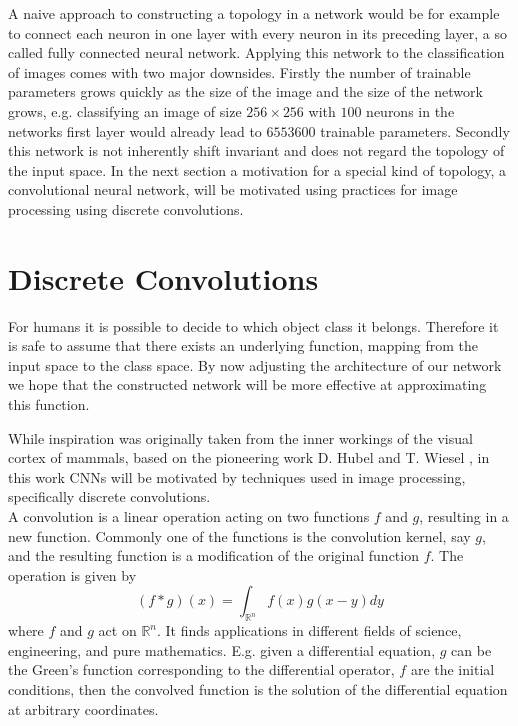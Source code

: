 A naive approach to constructing a topology in a network would be for example to connect each neuron in one layer with every neuron in its preceding layer, a so called fully connected neural network. Applying this network to the classification of images comes with two major downsides. Firstly the number of trainable parameters grows quickly as the size of the image and the size of the network grows, e.g. classifying an image of size $256\times 256$ with $100$ neurons in the networks first layer would already lead to $6553600$ trainable parameters. Secondly this network is not inherently shift invariant and does not regard the topology of the input space. In the next section a motivation for a special kind of topology, a convolutional neural network, will be motivated using practices for image processing using discrete convolutions.

\section{Discrete Convolutions}\label{sec:DiscreteConvolutions}
For humans it is possible to decide to which object class it belongs. Therefore it is safe to assume that there exists an underlying function, mapping from the input space to the class space. By now adjusting the architecture of our network we hope that the constructed network will be more effective at approximating this function. 

While inspiration was originally taken from the inner workings of the visual cortex of mammals, based on the pioneering work D. Hubel and T. Wiesel \cite{Hubel1959}, in this work CNNs will be motivated by techniques used in image processing, specifically discrete convolutions. \\


A convolution is a linear operation acting on two functions $f$ and $g$, resulting in a new function. Commonly one of the functions is the convolution kernel, say $g$, and the resulting function is a modification of the original function $f$. The operation is given by
\begin{equation} \label{eq:convolutionContinuous}
(f*g)(x) = \int_{\mathbb{R}^n} f(x)g(x-y)dy
\end{equation}
where $f$ and $g$ act on $\mathbb{R}^n$. It finds applications in different fields of science, engineering, and pure mathematics. E.g. given a differential equation, $g$ can be the Green's function corresponding to the differential operator, $f$ are the initial conditions, then the convolved function is the solution of the differential equation at arbitrary coordinates. \\

